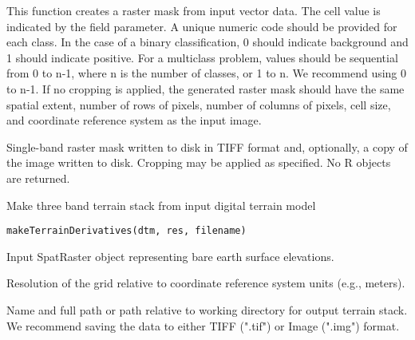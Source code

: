 \documentclass[a4paper]{book}
\begin{document}
%
\begin{Details}\relax
This function creates a raster mask from input vector data. The cell value is
indicated by the field parameter. A unique numeric code should be provided for
each class. In the case of a binary classification, 0 should indicate background
and 1 should indicate positive. For a multiclass problem, values should be sequential
from 0 to n-1, where n is the number of classes, or 1 to n. We recommend using
0 to n-1. If no cropping is applied, the generated raster mask should have the
same spatial extent, number of rows of pixels, number of columns of pixels,
cell size, and coordinate reference system as the input image.
\end{Details}
%
\begin{Value}
Single-band raster mask written to disk in TIFF format and, optionally,
a copy of the image written to disk. Cropping may be applied as specified.
No R objects are returned.
\end{Value}
%
\begin{Description}\relax
Make three band terrain stack from input digital terrain model
\end{Description}
%
\begin{Usage}
\begin{verbatim}
makeTerrainDerivatives(dtm, res, filename)
\end{verbatim}
\end{Usage}
%
\begin{Arguments}
\begin{ldescription}
\item[\code{dtm}] Input SpatRaster object representing bare earth surface elevations.

\item[\code{res}] Resolution of the grid relative to coordinate reference system
units (e.g., meters).

\item[\code{filename}] Name and full path or path relative to working directory for
output terrain stack. We recommend saving the data to either TIFF (".tif") or
Image (".img") format.
\end{ldescription}
\end{Arguments}
%
\end{document}
